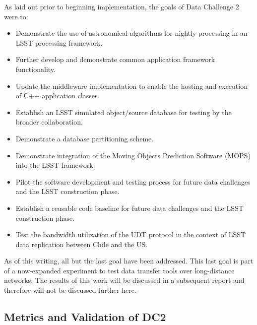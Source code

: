 As laid out prior to beginning implementation, the goals of Data
Challenge 2 were to:
\begin{itemize}
\item Demonstrate the use of astronomical algorithms for nightly
  processing in an LSST processing framework.
\item Further develop and demonstrate common application framework
  functionality.
\item Update the middleware implementation to enable the hosting and
  execution of C++ application classes.
\item Establish an LSST simulated object/source database for testing
  by the broader collaboration.
\item Demonstrate a database partitioning scheme.
\item Demonstrate integration of the Moving Objects Prediction
  Software (MOPS) into the LSST framework. 
\item Pilot the software development and testing process for future data
  challenges and the LSST construction phase.
\item Establish a reusable code baseline for future data challenges and
  the LSST construction phase.
\item Test the bandwidth utilization of the UDT protocol in the
  context of LSST data replication between Chile and the US.
\end{itemize}

As of this writing, all but the last goal have been addressed.  This
last goal is part of a now-expanded experiment to test data transfer
tools over long-distance networks.  The results of this work will be
discussed in a subsequent report and therefore will not be discussed
further here.  

\subsection{Metrics and Validation of DC2}

